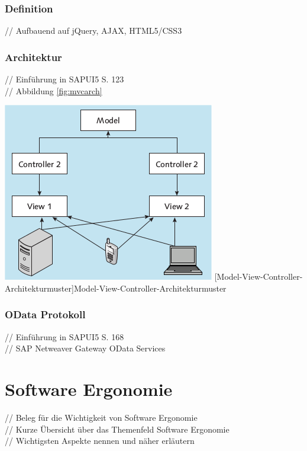\documentclass[12pt,a4paper,bibliography=totocnumbered,listof=totocnumbered]{scrartcl}
\begin{document}
\subsubsection{Definition}
// Aufbauend auf jQuery, AJAX, HTML5/CSS3 \cite{AntoEinf2014}\\

\subsubsection{Architektur}
// Einführung in SAPUI5 S. 123 \cite{AntoEinf2014}\\
// Abbildung \ref{fig:mvcarch}\\
	\vspace{1em}
	\begin{minipage}{\linewidth}
		\centering
		\includegraphics[width=0.6\linewidth]{images/mvc_arch.png}
		[Model-View-Controller-Architekturmuster]{Model-View-Controller-Architekturmuster\cite{AntoEinf2014}}
		\label{fig:mvcarch}
	\end{minipage}

\subsubsection{OData Protokoll}
// Einführung in SAPUI5 S. 168 \\
// SAP Netweaver Gateway OData Services\\
\pagebreak

\section{Software Ergonomie}
// Beleg für die Wichtigkeit von Software Ergonomie\\
// Kurze Übersicht über das Themenfeld Software Ergonomie\\
// Wichtigsten Aspekte nennen und näher erläutern\\
\end{document}
